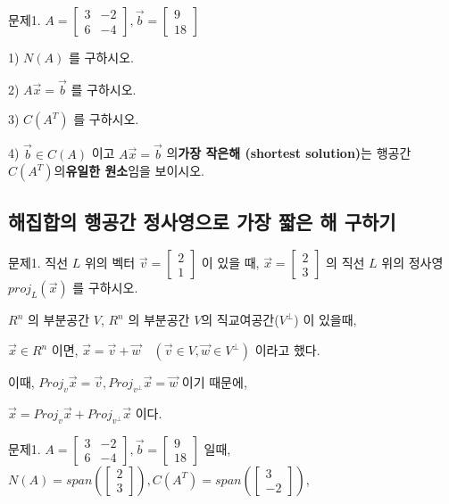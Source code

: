 \newpage
문제1. $A=\begin{bmatrix} 3 & -2 \\ 6 & -4 \end{bmatrix}, \vec{b} = \begin{bmatrix} 9 \\ 18 \end{bmatrix}$

1) $N(A)$ 를 구하시오.

2) $A\vec{x} = \vec{b}$ 를 구하시오.

3) $C(A^T)$ 를 구하시오.

4) $\vec{b} \in C(A)$ 이고 $A\vec{x} = \vec{b}$ 의\textbf{가장 작은해 (shortest solution)}는 행공간 $C(A^T)$의\textbf{유일한 원소}임을 보이시오.

\newpage
\subsection{해집합의 행공간 정사영으로 가장 짧은 해 구하기}
\newpage
문제1. 직선 $L$ 위의 벡터 $\vec{v} = \begin{bmatrix} 2 \\ 1 \end{bmatrix}$ 이 있을 때, $\vec{x} = \begin{bmatrix} 2 \\ 3 \end{bmatrix}$ 의 직선 $L$ 위의 정사영 $proj_L(\vec{x})$ 를 구하시오.

\begin{theorem}
$R^n$ 의 부분공간 $V$, $R^n$ 의 부분공간 $V$의 직교여공간($V^\perp$) 이 있을때,

$\vec{x} \in R^n$ 이면, $\vec{x} = \vec{v} + \vec{w} \quad (\vec{v} \in V, \vec{w} \in V^{\perp})$ 이라고 했다.

이때, $Proj_v\vec{x} = \vec{v}, Proj_{v^{\perp}}\vec{x} = \vec{w}$ 이기 때문에,

$\vec{x} = Proj_v\vec{x} + Proj_{v^{\perp}}\vec{x}$ 이다.
\end{theorem}

\newpage
문제1. $A=\begin{bmatrix} 3 & -2 \\ 6 & -4 \end{bmatrix}, \vec{b} = \begin{bmatrix} 9 \\ 18 \end{bmatrix}$ 일때, $N(A) = span(\begin{bmatrix} 2 \\ 3 \end{bmatrix}), C(A^T) = span(\begin{bmatrix} 3 \\ -2 \end{bmatrix})$,

